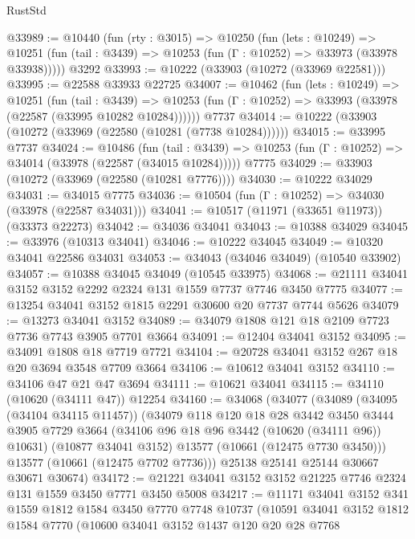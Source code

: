\begin{lexlean}{RustStd}
\begin{coremodule}
@33989 := @10440
    (fun (rty : @3015) =>
    @10250
      (fun (lets : @10249) =>
      @10251 (fun (tail : @3439) => @10253 (fun (Γ : @10252) => @33973 (@33978 @33938)))))
    @3292
@33993 := @10222 (@33903 (@10272 (@33969 @22581)))
@33995 := @22588 @33933 @22725
@34007 := @10462
    (fun (lets : @10249) =>
    @10251
      (fun (tail : @3439) =>
      @10253 (fun (Γ : @10252) => @33993 (@33978 (@22587 (@33995 @10282 @10284))))))
    @7737
@34014 := @10222 (@33903 (@10272 (@33969 (@22580 (@10281 (@7738 @10284))))))
@34015 := @33995 @7737
@34024 := @10486
    (fun (tail : @3439) => @10253 (fun (Γ : @10252) => @34014 (@33978 (@22587 (@34015 @10284)))))
    @7775
@34029 := @33903 (@10272 (@33969 (@22580 (@10281 @7776))))
@34030 := @10222 @34029
@34031 := @34015 @7775
@34036 := @10504 (fun (Γ : @10252) => @34030 (@33978 (@22587 @34031)))
@34041 := @10517 (@11971 (@33651 @11973)) (@33373 @22273)
@34042 := @34036 @34041
@34043 := @10388 @34029
@34045 := @33976 (@10313 @34041)
@34046 := @10222 @34045
@34049 := @10320 @34041 @22586 @34031
@34053 := @34043 (@34046 @34049) (@10540 @33902)
@34057 := @10388 @34045 @34049 (@10545 @33975)
@34068 := @21111 @34041 @3152 @3152 @2292 @2324 @131 @1559 @7737 @7746 @3450 @7775
@34077 := @13254 @34041 @3152 @1815 @2291 @30600 @20 @7737 @7744 @5626
@34079 := @13273 @34041 @3152
@34089 := @34079 @1808 @121 @18 @2109 @7723 @7736 @7743 @3905 @7701 @3664
@34091 := @12404 @34041 @3152
@34095 := @34091 @1808 @18 @7719 @7721
@34104 := @20728 @34041 @3152 @267 @18 @20 @3694 @3548 @7709 @3664
@34106 := @10612 @34041 @3152
@34110 := @34106 @47 @21 @47 @3694
@34111 := @10621 @34041
@34115 := @34110 (@10620 (@34111 @47)) @12254
@34160 := @34068
    (@34077
      (@34089
        (@34095 (@34104 @34115 @11457))
        (@34079
          @118
          @120
          @18
          @28
          @3442
          @3450
          @3444
          @3905
          @7729
          @3664
          (@34106 @96 @18 @96 @3442 (@10620 (@34111 @96)) @10631)
          (@10877 @34041 @3152)
          @13577
          (@10661 (@12475 @7730 @3450)))
        @13577
        (@10661 (@12475 @7702 @7736)))
      @25138
      @25141
      @25144
      @30667
      @30671
      @30674)
@34172 := @21221 @34041 @3152 @3152 @21225 @7746 @2324 @131 @1559 @3450 @7771 @3450 @5008
@34217 := @11171
    @34041
    @3152
    @341
    @1559
    @1812
    @1584
    @3450
    @7770
    @7748
    @10737
    (@10591
      @34041
      @3152
      @1812
      @1584
      @7770
      (@10600
        @34041
        @3152
        @1437
        @120
        @20
        @28
        @7768

\end{coremodule}
\end{lexlean}
